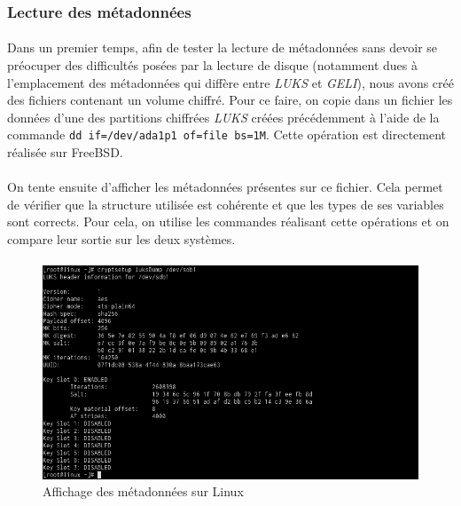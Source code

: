 \subsubsection{Lecture des métadonnées}
\paragraph{}
Dans un premier temps, afin de tester la lecture de métadonnées sans devoir se
préocuper des difficultés posées par la lecture de disque (notamment dues à
l'emplacement des métadonnées qui diffère entre \textit{LUKS} et \textit{GELI}),
nous avons créé des fichiers contenant un volume chiffré. Pour ce faire, on
copie dans un fichier les données d'une des partitions chiffrées \textit{LUKS}
créées précédemment à l'aide de la commande \texttt{dd if=/dev/ada1p1 of=file
  bs=1M}. Cette opération est directement réalisée sur FreeBSD.
\paragraph{}
On tente ensuite d'afficher les métadonnées présentes sur ce fichier. Cela
permet de vérifier que la structure utilisée est cohérente et que les types de
ses variables sont corrects. Pour cela, on utilise les commandes réalisant cette
opérations et on compare leur sortie sur les deux systèmes.
\paragraph{}
\begin{figure}[h]
\centering
\includegraphics[width=.9\linewidth]{tests/linux_dump_disk.png}
\caption{\label{fig:linux_dump_eli}Affichage des métadonnées sur Linux}
\end{figure}
